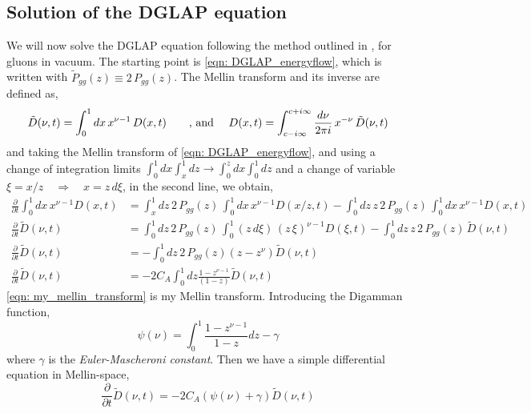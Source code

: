 \documentclass[main.tex]{subfiles}
\begin{document}
\subsection{Solution of the DGLAP equation}
We will now solve the DGLAP equation following the method outlined in \cite{Energy_flow_medium_cascade_2016}, for gluons in vacuum. The starting point is \autoref{eqn: DGLAP_energyflow}, which is written with \(\tilde P_{gg}(z) \equiv 2\, P_{gg}(z)\). The Mellin transform and its inverse are defined as,
\begin{equation*}\label{eqn: mellin_transforms}
    \Tilde{D}(\nu, t) = \int_0^1 dx\, x^{\nu-1} \, D(x,t) \qquad \text{, and }\quad D(x,t) = \int_{c-i\infty}^{c+i\infty} \frac{d\nu}{2\pi i}\, x^{-\nu} \, \Tilde{D}(\nu, t)
\end{equation*}
and taking the Mellin transform of \autoref{eqn: DGLAP_energyflow}, and using a change of integration limits \(\int_0^1 dx \int_x^1 dz \rightarrow \int_0^z dx\int_0^1 dz\) and a change of variable \(\xi = x/z \quad \Rightarrow \quad x=z\, d\xi\), in the second line, we obtain,
\begin{align}
    \frac{\partial}{\partial t} \int_0^1 dx\,x^{\nu-1} D(x,t) &= \int_x^1 dz\, 2\, P_{gg}(z)\, \int_0^1 dx\, x^{\nu-1} D(x/z,t) - \int_0^1 dz\, z\,2\, P_{gg}(z)\, \int_0^1 dx\,x^{\nu-1} D(x,t) \nonumber \\
    \frac{\partial}{\partial t} \tilde D(\nu,t) &= \int_0^1 dz\, 2\, P_{gg}(z)\, \int_0^1 (z\, d\xi)\, (z\, \xi)^{\nu-1} D(\xi,t) - \int_0^1 dz\, z\, 2\, P_{gg}(z)\, \tilde D(\nu,t) \nonumber \\
    \frac{\partial}{\partial t} \tilde D(\nu,t) &= -\int_0^1 dz\,2\, P_{gg}(z) \left(z-z^\nu \right) \tilde D(\nu,t) \nonumber \\
    \frac{\partial}{\partial t} \tilde D(\nu,t) &= -2C_A \int_0^1 dz \frac{1-z^{\nu-1}}{(1-z)} \tilde D(\nu,t) \label{eqn: my_mellin_transform}
\end{align}
\autoref{eqn: my_mellin_transform} is my Mellin transform. Introducing the Digamman function, 
\begin{equation}\label{eqn: digamma_function}
    \psi(\nu) = \int_0^1 \frac{1-z^{\nu-1}}{1-z}dz - \gamma
\end{equation}
where \(\gamma\) is the \emph{Euler-Mascheroni constant}. Then we have a simple differential equation in Mellin-space,
\begin{equation}
    \frac{\partial}{\partial t} \tilde D(\nu,t) = -2C_A (\psi(\nu)+\gamma) \tilde D(\nu,t) 
\end{equation}
\end{document}
